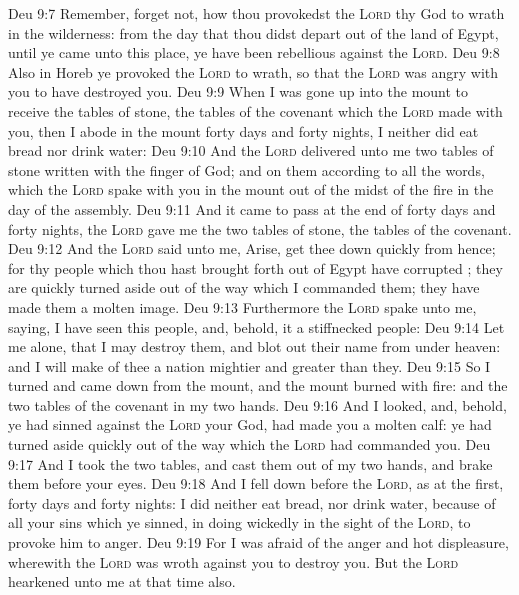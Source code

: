 \vs Deu 9:7 Remember,  forget not, how thou provokedst the \textsc{Lord} thy God to wrath in the wilderness: from the day that thou didst depart out of the land of Egypt, until ye came unto this place, ye have been rebellious against the \textsc{Lord}.
\vs Deu 9:8 Also in Horeb ye provoked the \textsc{Lord} to wrath, so that the \textsc{Lord} was angry with you to have destroyed you.
\vs Deu 9:9 When I was gone up into the mount to receive the tables of stone,  the tables of the covenant which the \textsc{Lord} made with you, then I abode in the mount forty days and forty nights, I neither did eat bread nor drink water:
\vs Deu 9:10 And the \textsc{Lord} delivered unto me two tables of stone written with the finger of God; and on them  according to all the words, which the \textsc{Lord} spake with you in the mount out of the midst of the fire in the day of the assembly.
\vs Deu 9:11 And it came to pass at the end of forty days and forty nights,  the \textsc{Lord} gave me the two tables of stone,  the tables of the covenant.
\vs Deu 9:12 And the \textsc{Lord} said unto me, Arise, get thee down quickly from hence; for thy people which thou hast brought forth out of Egypt have corrupted ; they are quickly turned aside out of the way which I commanded them; they have made them a molten image.
\vs Deu 9:13 Furthermore the \textsc{Lord} spake unto me, saying, I have seen this people, and, behold, it  a stiffnecked people:
\vs Deu 9:14 Let me alone, that I may destroy them, and blot out their name from under heaven: and I will make of thee a nation mightier and greater than they.
\vs Deu 9:15 So I turned and came down from the mount, and the mount burned with fire: and the two tables of the covenant  in my two hands.
\vs Deu 9:16 And I looked, and, behold, ye had sinned against the \textsc{Lord} your God,  had made you a molten calf: ye had turned aside quickly out of the way which the \textsc{Lord} had commanded you.
\vs Deu 9:17 And I took the two tables, and cast them out of my two hands, and brake them before your eyes.
\vs Deu 9:18 And I fell down before the \textsc{Lord}, as at the first, forty days and forty nights: I did neither eat bread, nor drink water, because of all your sins which ye sinned, in doing wickedly in the sight of the \textsc{Lord}, to provoke him to anger.
\vs Deu 9:19 For I was afraid of the anger and hot displeasure, wherewith the \textsc{Lord} was wroth against you to destroy you. But the \textsc{Lord} hearkened unto me at that time also.
